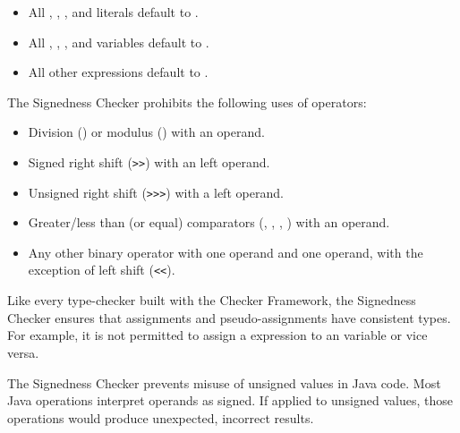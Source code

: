 \begin{itemize}

    \item
    All , , , and  literals default
    to .
    \item
    All , , , and  variables default
    to .
    \item
    All other expressions default to .

\end{itemize}



The Signedness Checker prohibits the following uses of operators:

\begin{itemize}

    \item
    Division (\code{/}) or modulus (\code{\%}) with an 
    operand.
    \item
    Signed right shift (\verb|>>|) with an  left operand.
    \item
    Unsigned right shift (\verb|>>>|) with a  left operand.
    \item
    Greater/less than (or equal) comparators
    (\code{<}, \code{<=}, \code{>}, \code{>=}) with an 
    operand.
    \item
    Any other binary operator with one  operand and one
     operand, with the exception of left shift (\verb|<<|).

\end{itemize}

Like every type-checker built with the Checker Framework, the Signedness
Checker ensures that assignments and pseudo-assignments have consistent types.
For example, it is not permitted to assign a  expression to an
 variable or vice versa.



The Signedness Checker prevents misuse of unsigned values in Java code.
Most Java operations interpret operands as signed.  If applied to unsigned
values, those operations would produce unexpected, incorrect results.

